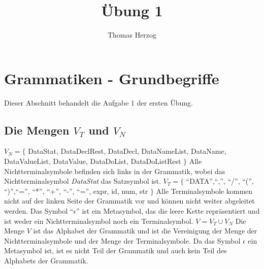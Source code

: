 \documentclass[11pt, a4paper, twoside]{article}   	%
\title{Übung 1}
\author{Thomas Herzog}
\begin{document}
\setlength{\headheight}{15mm}


\section {Grammatiken - Grundbegriffe}
\label{sec:grammar-basics}
Dieser Abschnitt behandelt die Aufgabe 1 der ersten Übung.
\subsection{Die Mengen $V_{T}$ und $V_{N}$}
$V_{N}=\{$ DataStat, DataDeclRest, DataDecl, DataNameList, DataName, DataValueList, DataValue, DataDoList, DataDoListRest $\}$
\newline
\newline
Alle Nichtterminalsymbole befinden sich links in der Grammatik, wobei das Nichtterminalsymbol \emph{DataStat} das Satzsymbol ist.
\newline
\newline
\newline
$V_{T}=\{$ \enquote{DATA},\enquote{,}, \enquote{/}, \enquote{(}, \enquote{)},\enquote{=}, \enquote{*}, \enquote{+}, \enquote{-}, \enquote{=}, expr, id, num, str $\}$
\newline
\newline
Alle Terminalsymbole kommen nicht auf der linken Seite der Grammatik vor und können nicht weiter abgeleitet werden. Das Symbol \enquote{$\epsilon$} ist ein Metasymbol, das die leere Kette repräsentiert und ist weder ein Nichtterminalsymbol noch ein Terminalsymbol.
\newline
\newline
\newline
$V=V_{T} \cup V_{N}$
\newline
\newline
Die Menge $V$ ist das Alphabet der Grammatik und ist die Vereinigung der Menge der Nichtterminalsymbole und der Menge der Terminalsymbole. Da das Symbol $\epsilon$ ein Metasymbol ist, ist es nicht Teil der Grammatik und auch kein Teil des Alphabets der Grammatik.
\end{document}
